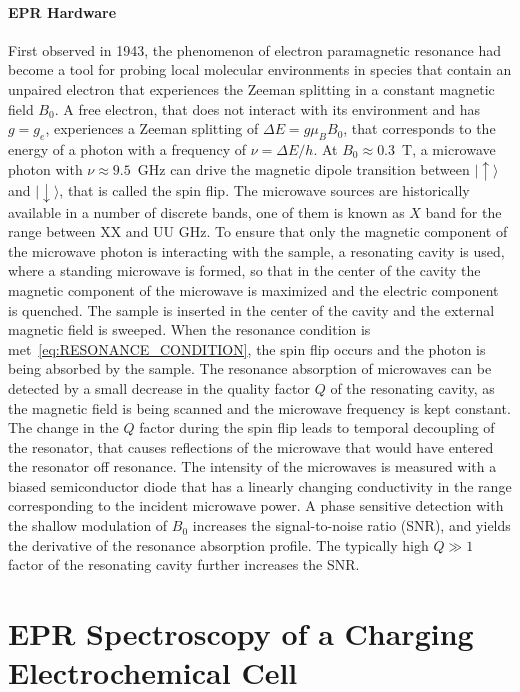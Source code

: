 \paragraph{EPR Hardware}
First observed in 1943, the phenomenon of electron paramagnetic resonance had become a tool for probing local molecular environments in species that contain an unpaired electron that experiences the Zeeman splitting in a constant magnetic field $B_0$. A free electron, that does not interact with its environment and has $g=g_e$, experiences a Zeeman splitting of $\Delta E = g \mu_B B_0$, that corresponds to the energy of a photon with a frequency of $\nu=\Delta E / h$. At $B_0\approx0.3$~T, a microwave photon with $\nu\approx9.5$~GHz can drive the magnetic dipole transition between $\vert{\uparrow\rangle}$ and $\vert{\downarrow\rangle}$, that is called the spin flip. The microwave sources are historically\cite{RADARS} available in a number of discrete bands, one of them is known as $X$ band for the range between XX and UU GHz. To ensure that only the magnetic component of the microwave photon is interacting with the sample, a resonating cavity is used, where a standing microwave is formed, so that in the center of the cavity the magnetic component of the microwave is maximized and the electric component is quenched. The sample is inserted in the center of the cavity and the external magnetic field is sweeped. When the resonance condition is met~\ref{eq:RESONANCE_CONDITION}, the spin flip occurs and the photon is being absorbed by the sample. The resonance absorption of microwaves can be detected by a small decrease in the quality factor $Q$ of the resonating cavity, as the magnetic field is being scanned and the microwave frequency is kept constant. The change in the $Q$ factor during the spin flip leads to temporal decoupling of the resonator, that causes reflections of the microwave that would have entered the resonator off resonance. The intensity of the microwaves is measured with a biased semiconductor diode that has a linearly changing conductivity in the range corresponding to  the incident microwave power. A phase sensitive detection with the shallow modulation of $B_0$ increases the signal-to-noise ratio (SNR), and yields the derivative of the resonance absorption profile. The typically high $Q\gg1$ factor of the resonating cavity further increases the SNR.


\section{EPR Spectroscopy of a Charging Electrochemical Cell}


